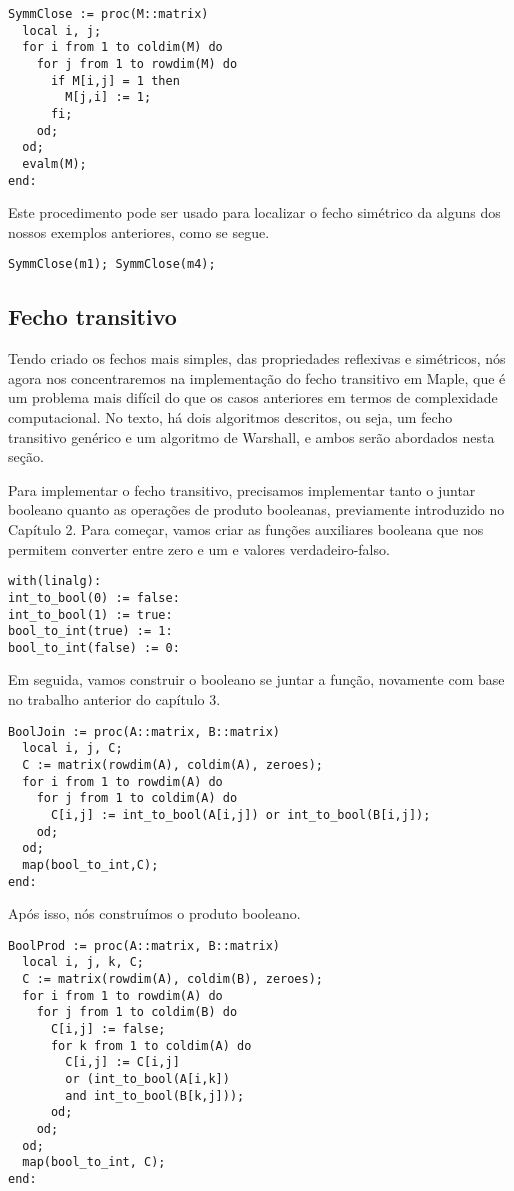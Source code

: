 \documentclass[a4paper]{article}
\begin{document}
\begin{lstlisting}
SymmClose := proc(M::matrix)
  local i, j;
  for i from 1 to coldim(M) do
    for j from 1 to rowdim(M) do
      if M[i,j] = 1 then
        M[j,i] := 1;
      fi;
    od;
  od;
  evalm(M);
end:
\end{lstlisting}

Este procedimento pode ser usado para localizar o fecho simétrico da alguns dos nossos exemplos anteriores, como se segue.

\begin{lstlisting}
SymmClose(m1); SymmClose(m4);
\end{lstlisting}

\subsection{Fecho transitivo}
Tendo criado os fechos mais simples, das propriedades reflexivas e simétricos, nós agora nos concentraremos na implementação do fecho transitivo em Maple, que é um problema mais difícil do que os casos anteriores em termos de complexidade computacional. No texto, há dois algoritmos descritos, ou seja, um fecho transitivo genérico e um algoritmo de Warshall, e ambos serão abordados nesta seção.

Para implementar o fecho transitivo, precisamos implementar tanto o juntar booleano quanto as operações de produto booleanas, previamente introduzido no Capítulo 2. Para começar, vamos criar as funções auxiliares booleana que nos permitem converter entre zero e um e valores verdadeiro-falso.

\begin{lstlisting}
with(linalg):
int_to_bool(0) := false:
int_to_bool(1) := true:
bool_to_int(true) := 1:
bool_to_int(false) := 0:
\end{lstlisting}

Em seguida, vamos construir o booleano se juntar a função, novamente com base no trabalho anterior do capítulo 3.

\begin{lstlisting}
BoolJoin := proc(A::matrix, B::matrix)
  local i, j, C;
  C := matrix(rowdim(A), coldim(A), zeroes);
  for i from 1 to rowdim(A) do
    for j from 1 to coldim(A) do
      C[i,j] := int_to_bool(A[i,j]) or int_to_bool(B[i,j]);
    od;
  od;
  map(bool_to_int,C);
end:
\end{lstlisting}

Após isso, nós construímos o produto booleano.

\begin{lstlisting}
BoolProd := proc(A::matrix, B::matrix)
  local i, j, k, C;
  C := matrix(rowdim(A), coldim(B), zeroes);
  for i from 1 to rowdim(A) do
    for j from 1 to coldim(B) do
      C[i,j] := false;
      for k from 1 to coldim(A) do
        C[i,j] := C[i,j]
        or (int_to_bool(A[i,k])
        and int_to_bool(B[k,j]));
      od;
    od;
  od;
  map(bool_to_int, C);
end:
\end{lstlisting}
\end{document}
